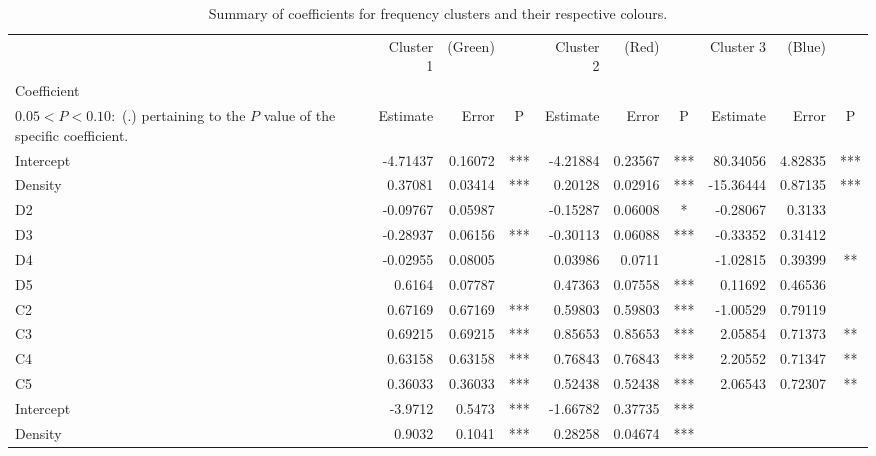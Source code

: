 \documentclass[11pt,letterpaper]{article}
\numberwithin{equation}{section}
\numberwithin{equation}{section}
\numberwithin{equation}{section}
\begin{document}
\begin{center}
\begin{table}
\caption{Summary of coefficients for frequency clusters and their respective colours.}
\label{frequencySummary}
\begin{tabular}{|l|rrc|rrc|rrc|}
\hline\hline
          & Cluster 1 & (Green) &   & Cluster 2 & (Red) &  & Cluster 3 & (Blue) &   \\
Coefficient \footnote{The significance codes are defined as $  P < 0.001 : $  (***), $0.001 < P < 0.01:$ (**), $  0.01 < P < 0.05:$ (*),\\ $0.05 < P < 0.10 : $ (.) %
pertaining to the $P$ value of the specific coefficient.}             & Estimate  & Error & P   & Estimate  & Error   & P   & Estimate  & Error  & P  \\
 \hline
Intercept & -4.71437 & 0.16072 & *** & -4.21884 & 0.23567 & *** & 80.34056  & 4.82835 & *** \\
Density   & 0.37081  & 0.03414 & *** & 0.20128  & 0.02916 & *** & -15.36444 & 0.87135 & *** \\
D2        & -0.09767 & 0.05987 &     & -0.15287 & 0.06008 & *   & -0.28067  & 0.3133  &     \\
D3        & -0.28937 & 0.06156 & *** & -0.30113 & 0.06088 & *** & -0.33352  & 0.31412 &     \\
D4        & -0.02955 & 0.08005 &     & 0.03986  & 0.0711  &     & -1.02815  & 0.39399 & **  \\
D5        & 0.6164   & 0.07787 &     & 0.47363  & 0.07558 & *** & 0.11692   & 0.46536 &     \\
C2        & 0.67169  & 0.67169 & *** & 0.59803  & 0.59803 & *** & -1.00529  & 0.79119 &     \\
C3        & 0.69215  & 0.69215 & *** & 0.85653  & 0.85653 & *** & 2.05854   & 0.71373 & **  \\
C4        & 0.63158  & 0.63158 & *** & 0.76843  & 0.76843 & *** & 2.20552   & 0.71347 & **  \\
C5        & 0.36033  & 0.36033 & *** & 0.52438  & 0.52438 & *** & 2.06543   & 0.72307 & **  \\
\hline
Intercept & -3.9712  & 0.5473  & *** & -1.66782 & 0.37735 & *** &           &         &     \\
Density   & 0.9032   & 0.1041  & *** & 0.28258  & 0.04674 & *** &           &         &    \\
\hline\hline
\end{tabular}
\end{table}
\end{center}
\newpage
\end{document}
